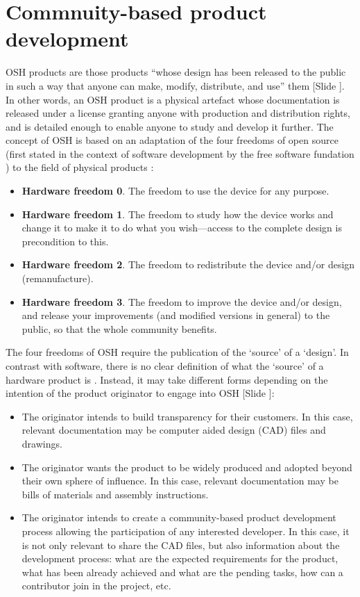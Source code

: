 \documentclass{article}
\newcounter{slide}
\begin{document}
\section{Commnuity-based product development}
\label{sec:osh}
OSH products are those products ``whose design has been released to the public in such a way that anyone can make, modify, distribute, and use'' them \cite{opensourcehardwareassociationOpenSourceHardware2016} {\color{blue}[Slide ]}. In other words, an OSH product is a physical artefact whose documentation is released under a license granting anyone with production and distribution rights, and is detailed enough to enable anyone to study and develop it further. The concept of OSH is based on an adaptation of the four freedoms of open source (first stated in the context of software development by the free software fundation \cite{freesoftwarefoundationFreeSoftwareDefinition2015}) to the field of physical products \cite{powellDemocratizingProductionOpen2012}: 
\begin{itemize}
	\item \textbf{Hardware freedom 0}. The freedom to use the device for any purpose.
	\item \textbf{Hardware freedom 1}. The freedom to study how the device works and change it to make it to do what you wish---access to the complete design is precondition to this.
	\item \textbf{Hardware freedom 2}. The freedom to redistribute the device and/or design (remanufacture).
	\item \textbf{Hardware freedom 3}. The freedom to improve the device and/or design, and release your improvements (and modified versions in general) to the public, so that the whole community benefits.
\end{itemize}

The four freedoms of OSH require the publication of the `source' of a `design'. In contrast with software, there is no clear definition of what the `source' of a hardware product is \cite{bonvoisinWhatSourceOpen2017}. Instead, it may take different forms depending on the intention of the product originator to engage into OSH {\color{blue}[Slide ]}:
\begin{itemize}
  \item The originator intends to build transparency for their customers. In this case, relevant documentation may be computer aided design (CAD) files and drawings.
  \item The originator wants the product to be widely produced and adopted beyond their own sphere of influence. In this case, relevant documentation may be bills of materials and assembly instructions.
  \item The originator intends to create a community-based product development process allowing the participation of any interested developer. In this case, it is not only relevant to share the CAD files, but also information about the development process: what are the expected requirements for the product, what has been already achieved and what are the pending tasks, how can a contributor join in the project, etc.
\end{itemize}
\end{document}
